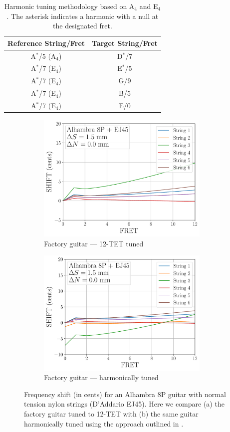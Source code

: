  \begin{table}[htbp]
  \centering
  \caption{\label{tbl:harmonic_tuning} Harmonic tuning methodology based on A$_4$ and E$_4$. The asterisk indicates a harmonic with a null at the designated fret.}
    \begin{tabular}{cc}
    \toprule
    Reference String/Fret &  Target String/Fret \\
    \midrule
     A$^\ast$/5 (A$_4$) & D$^\ast$/7 \\
     A$^\ast$/7 (E$_4$) & E$^\ast$/5 \\
     A$^\ast$/7 (E$_4$) & G/9 \\
     A$^\ast$/7 (E$_4$) & B/5 \\
     A$^\ast$/7 (E$_4$) & E/0 \\
    \bottomrule
    \end{tabular}
 \end{table}%

 \begin{figure}
  \centering
  \begin{subfigure}[b]{0.45\textwidth}
   \centering
   \includegraphics[width=3.25in]{figures/shift_alhambra8p_ej45_factory}
   \caption{Factory guitar --- 12-TET tuned}
   \label{fig:shift_alhambra8p_ej45_fact_temp}
  \end{subfigure}
  \hspace{0.25in}
  \begin{subfigure}[b]{0.45\textwidth}
   \centering
   \includegraphics[width=3.25in]{figures/shift_alhambra8p_ej45_harmonic}
   \caption{Factory guitar --- harmonically tuned}
   \label{fig:shift_alhambra8p_ej45_harmonic}
  \end{subfigure}
  \caption{\label{fig:compensation_alhambra8p_ej45_temp} Frequency shift (in cents) for an Alhambra 8P guitar with normal tension nylon strings (D'Addario EJ45). Here we compare (a) the factory guitar tuned to 12-TET with (b) the same guitar harmonically tuned using the approach outlined in .}
 \end{figure}

